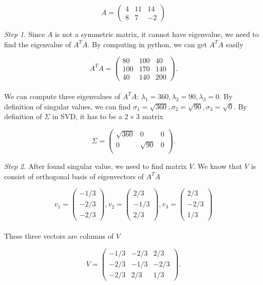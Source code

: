 \documentclass{article}
\begin{document}
\[A = 
	\begin{pmatrix}
		4 & 11 & 14 \\
		8 & 7 & -2 
	\end{pmatrix}\]
\vspace{1mm} 

\textit{Step 1.} Since $A$ is not a symmetric matrix, it cannot  have eigenvalue, we need to find the eigenvalue of $A^TA$. By computing in python, we can get $A^TA$ easily

\[A^TA= 
	\begin{pmatrix}
		80 & 100 & 40 \\
		100 & 170 & 140 \\
		40 & 140 & 200 
	\end{pmatrix}.\]
\\
We can compute three eigenvalues of $A^TA$: $\lambda_1 = 360, \lambda_2 = 90, \lambda_3 = 0$. By definition of singular values, we can find $\sigma_1 = \sqrt{360}, \sigma_2 = \sqrt{90}, \sigma_3 = \sqrt{0}$. By definition of $\Sigma$ in SVD, it has to be a $2 \times 3$ matrix

\[\Sigma= 
\begin{pmatrix}
	\sqrt{360} & 0 & 0 \\
	0 & \sqrt{90} & 0 \\
\end{pmatrix}.\]

\textit{Step 2.} After found singular value, we need to find matrix $V$. We know that $V$ is consist of orthogonal basis of eigenvectors of $A^TA$

\[v_1 = 
	\begin{pmatrix}
		-1/3 \\
		-2/3 \\
		-2/3
	\end{pmatrix},
	v_2 = \begin{pmatrix}
				2/3 \\
				-1/3 \\
				2/3
			\end{pmatrix},
			v_3 = \begin{pmatrix}
							2/3 \\
							-2/3 \\
							1/3
						\end{pmatrix}\]
\\
These three vectors are columns of $V$

\[V= 
\begin{pmatrix}
	-1/3 & -2/3 & 2/3 \\
	-2/3 & -1/3 & -2/3 \\
	-2/3 & 2/3 & 1/3 
\end{pmatrix}.\]
\end{document}
